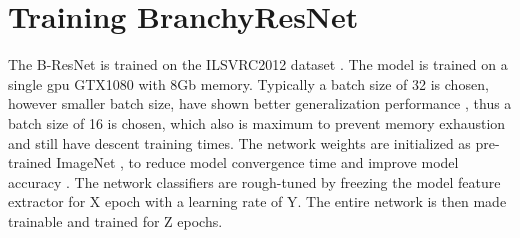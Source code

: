 
\section{Training BranchyResNet}

The B-ResNet is trained on the ILSVRC2012 dataset \cite{russakovsky_imagenet_2015}. The model is trained on a single \gls{gpu} GTX1080 with 8Gb memory. Typically a batch size of 32 is chosen, however smaller batch size, have shown better generalization performance \cite{masters_revisiting_nodate}, thus a batch size of 16 is chosen, which also is maximum to prevent memory exhaustion and still have descent training times. The network weights are initialized as pre-trained ImageNet \cite{russakovsky_imagenet_2015}, to reduce model convergence time and improve model accuracy \cite{yosinski_how_2014}. The network classifiers are rough-tuned by freezing the model feature extractor for X epoch with a learning rate of Y. The entire network is then made trainable and trained for Z epochs.

